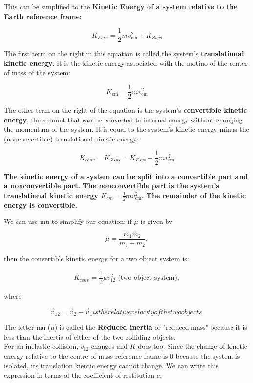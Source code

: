         This can be simplified to the \textbf{Kinetic Energy of a system relative to the Earth reference frame:}

        \[
            K_{Esys} = \frac{1}{2}mv^2_{\text{cm}} + K_{Zsys}
        \]

        The first term on the right in this equation is called the system's \textbf{translational kinetic energy}. It is the kinetic energy associated with the motino of the center of mass of the system:

        \[
            K_{\text{cm}} = \frac{1}{2}mv^2_{\text{cm}}
        \]

        \pagebreak

        The other term on the right of the equation is the system's \textbf{convertible kinetic energy}, the amount that can be converted to internal energy without changing the momentum of the system. It is equal to the
        system's kinetic energy minus the (nonconvertible) translational kinetic energy:

        \[
            K_{conv} = K_{Zsys} = K_{Esys} - \frac{1}{2}mv^2_{\text{cm}}
        \]

        \color{blue} \textbf{The kinetic energy of a system can be split into a convertible part and a nonconvertible part. The nonconvertible part is the system's translational kinetic energy
        $K_{cm}=\frac{1}{2}mv^2_\text{cm}$. The remainder of the kinetic energy is convertible.} \color{black}

        We can use mu to simplify our equation; if $\mu$ is given by

        \[
            \mu = \frac{m_1 m_2}{m_1 + m_2},
        \]

        then the convertible kinetic energy for a two object system is:

        \[
            K_{conv} = \frac{1}{2}\mu v^2_{12} \text{ (two-object system)},
        \]

        where

        \[
            \vec{v}_{12} = \vec{v}_2 - \vec{v}_1 is the relative velocity of the two objects.
        \]

        The letter mu ($\mu$) is called the \textbf{Reduced inertia} or "reduced mass" because it is less than the inertia of either of the two colliding objects. \\

        For an inelastic collision, $v_{12}$ changes and $K$ does too. Since the change of kinetic energy relative to the centre of mass reference frame is 0 because the system is isolated, its translation kientic
        energy cannot change. We can write this expression in terms of the coefficient of restitution $e$:

